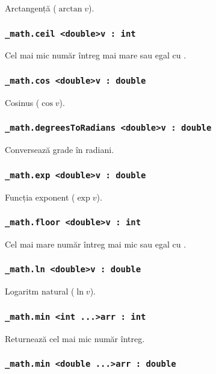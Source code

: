 Arctangență ($\arctan{v}$).

\subsubsection{\lstinline|_math.ceil <double>v : int|}

Cel mai mic număr întreg mai mare sau egal cu .

\subsubsection{\lstinline|_math.cos <double>v : double|}

Cosinus ($\cos{v}$).

\subsubsection{\lstinline|_math.degreesToRadians <double>v : double|}

Conversează grade în radiani.

\subsubsection{\lstinline|_math.exp <double>v : double|}

Funcția exponent ($\exp{v}$).

\subsubsection{\lstinline|_math.floor <double>v : int|}

Cel mai mare număr întreg mai mic sau egal cu .

\subsubsection{\lstinline|_math.ln <double>v : double|}

Logaritm natural ($\ln{v}$).

\subsubsection{\lstinline|_math.min <int ...>arr : int|}

Returnează cel mai mic număr întreg.

\subsubsection{\lstinline|_math.min <double ...>arr : double|}

